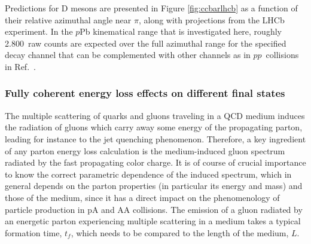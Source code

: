 \documentclass[../report.tex]{subfiles}
\begin{document}
Predictions for D mesons are presented in Figure \ref{fig:ccbarlhcb} as a function of their relative azimuthal angle near $\pi$, along with projections from the LHCb experiment. In the $p$Pb kinematical range that is investigated here, roughly 2.800~raw counts are expected over the full azimuthal range for the specified decay channel that can be complemented with other channels as in $pp$~collisions in Ref.~\cite{Aaij:2012dz}. %




\subsubsection{Fully coherent energy loss effects on different final states}
\label{subsubsec:coherent}

The multiple scattering of quarks and gluons traveling in a QCD medium induces the radiation of gluons which carry away some energy of the propagating parton, leading for instance to the jet quenching phenomenon. Therefore, a key ingredient of any parton energy loss calculation is  the medium-induced gluon spectrum radiated by the fast propagating color charge. It is of course of crucial importance to know the correct parametric dependence of the induced spectrum, which in general depends on the parton properties (in particular its energy and mass) and those of the medium, since it has a direct impact on the phenomenology of particle production in pA and AA collisions. The emission of a gluon radiated by an energetic parton experiencing multiple scattering in a medium takes a typical formation time, $t_f$, which needs to be compared to the length of the medium, $L$.
\end{document}
